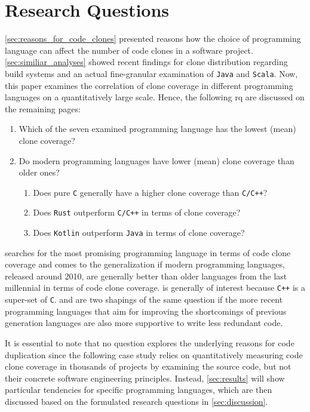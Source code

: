 
\section{Research Questions}
\label{sec:research_question}

\autoref{sec:reasons_for_code_clones} presented reasons how the choice of programming language can affect the number of code clones in a software project. \autoref{sec:similiar_analyses} showed recent findings for clone distribution regarding build systems and an actual fine-granular examination of \texttt{Java} and \texttt{Scala}. Now, this paper examines the correlation of clone coverage in different programming languages on a quantitatively large scale. Hence, the following \ac{rq} are discussed on the remaining pages:

\bigskip
\begin{minipage}{0.95\linewidth}
	\begin{enumerate}[label=RQ \arabic*]
		\item Which of the seven examined programming language has the lowest (mean) clone coverage? \label{question:clone_coverage_lowest}
		\item Do modern programming languages have lower (mean) clone coverage than older ones? \label{question:comparing_age}
		\begin{enumerate}
			\item Does pure \texttt{C} generally have a higher clone coverage than \texttt{C/C++}? \label{question:compare_c_cpp}
			\item Does \texttt{Rust} outperform \texttt{C/C++} in terms of clone coverage? \label{question:compare_rust_c}
			\item Does \texttt{Kotlin} outperform \texttt{Java} in terms of clone coverage? \label{question:compare_kotlin_java}
		\end{enumerate}
	\end{enumerate}
\end{minipage}
\bigskip

 searches for the most promising programming language in terms of code clone coverage and comes to the generalization if modern programming languages, released around 2010, are generally better than older languages from the last millennial in terms of code clone coverage.
 is generally of interest because \texttt{C++} is a super-set of \texttt{C}.   and  are two shapings of the same question if the more recent programming languages that aim for improving the shortcomings of previous generation languages are also more supportive to write less redundant code.

It is essential to note that no question explores the underlying reasons for code duplication since the following case study relies on quantitatively measuring code clone coverage in thousands of projects by examining the source code, but not their concrete software engineering principles. Instead, \autoref{sec:results} will show particular tendencies for specific programming languages, which are then discussed based on the formulated research questions in \autoref{sec:discussion}.
